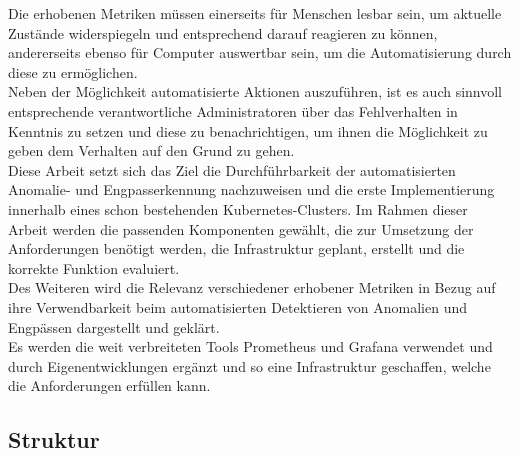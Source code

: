 \documentclass[a4paper,12pt]{scrartcl}
\begin{document}
Die erhobenen Metriken müssen einerseits für Menschen lesbar sein, um aktuelle Zustände widerspiegeln und entsprechend darauf reagieren zu können, andererseits ebenso für Computer auswertbar sein, um die Automatisierung durch diese zu ermöglichen.\\
Neben der Möglichkeit automatisierte Aktionen auszuführen, ist es auch sinnvoll entsprechende verantwortliche Administratoren über das Fehlverhalten in Kenntnis zu setzen und diese zu benachrichtigen, um ihnen die Möglichkeit zu geben dem Verhalten auf den Grund zu gehen.\\
Diese Arbeit setzt sich das Ziel die Durchführbarkeit der automatisierten Anomalie- und Engpasserkennung nachzuweisen und die erste Implementierung innerhalb eines schon bestehenden Kubernetes-Clusters. 
Im Rahmen dieser Arbeit werden die passenden Komponenten gewählt, die zur Umsetzung der Anforderungen benötigt werden, die Infrastruktur geplant, erstellt und die korrekte Funktion evaluiert.\\
Des Weiteren wird die Relevanz verschiedener erhobener Metriken in Bezug auf ihre Verwendbarkeit beim automatisierten Detektieren von Anomalien und Engpässen dargestellt und geklärt.\\
Es werden die weit verbreiteten Tools Prometheus und Grafana verwendet und durch Eigenentwicklungen ergänzt und so eine Infrastruktur geschaffen, welche die Anforderungen erfüllen kann.

\subsection{Struktur}
\end{document}
